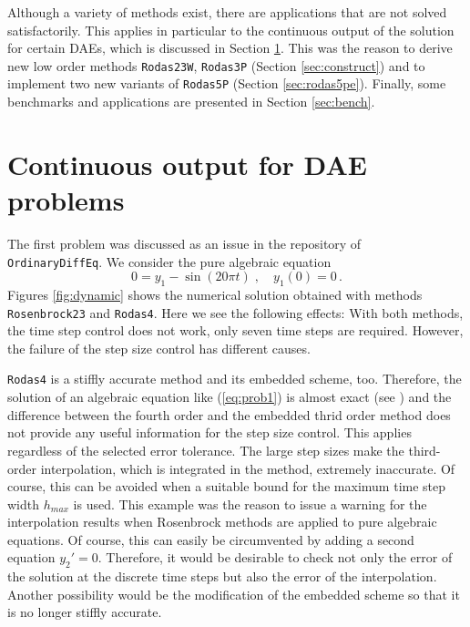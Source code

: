 \documentclass{juliacon}
\begin{document}
Although a variety of methods exist, there are applications that are not solved satisfactorily. This applies in particular to the continuous output of the 
solution for certain DAEs, which is discussed in Section \ref{sec:cont}.
This was the reason to derive new low order methods \verb|Rodas23W|, \verb|Rodas3P| (Section \ref{sec:construct}) and 
to implement two new variants of \verb|Rodas5P| (Section \ref{sec:rodas5pe}).
Finally, some benchmarks and applications are presented in Section \ref{sec:bench}.

\section{Continuous output for DAE problems} \label{sec:cont}

The first problem was discussed as an issue in the repository of\\ \verb|OrdinaryDiffEq|.
We consider the pure algebraic equation
\begin{equation} 0 = y_1 - \sin(20 \pi t) \; , \quad y_1(0)=0 \, .\label{eq:prob1} \end{equation}
Figures \ref{fig:dynamic} shows the numerical solution obtained with methods \verb|Rosenbrock23| and \verb|Rodas4|.
Here we see the following effects: With both methods, the time step control does not work, only seven time steps are required. 
However, the failure of the step size control has different causes. 

\verb|Rodas4| is a stiffly accurate method and its embedded scheme, too. Therefore, the solution of an algebraic equation like (\ref{eq:prob1}) is 
almost exact (see \cite{hairer}) and the difference between the fourth order and the embedded thrid order method does not provide any useful information for the 
step size control.
This applies regardless of the selected error tolerance.
The large step sizes make the third-order interpolation, which is integrated in the method, extremely inaccurate.
Of course, this can be avoided when a suitable bound for the maximum time step width $h_{max}$ is used. 
This example was the reason to issue a warning for the interpolation results when Rosenbrock methods are applied to pure algebraic equations.
Of course, this can easily be circumvented by adding a second equation $y_2'=0$. 
Therefore, it would be desirable to check not only the error of the solution at the discrete time steps but also the error of the interpolation.
Another possibility would be the modification of the embedded scheme so that it is no longer stiffly accurate.
\end{document}
